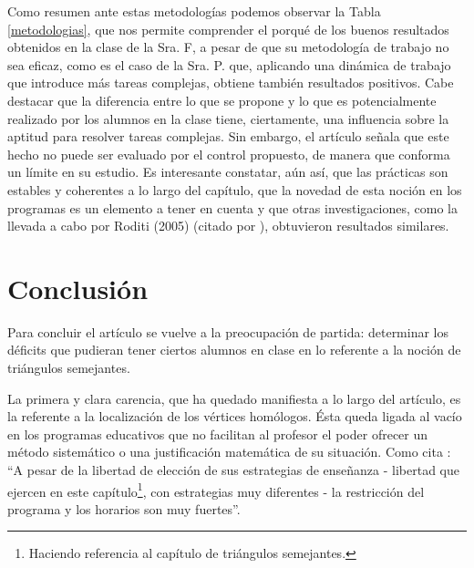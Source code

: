 	Como resumen ante estas metodologías podemos observar la Tabla \ref{metodologias}, que nos permite comprender el porqué de los buenos resultados obtenidos en la clase de la Sra. F, a pesar de que su metodología de trabajo no sea eficaz, como es el caso de la Sra. P. que, aplicando una dinámica de trabajo que introduce más tareas complejas, obtiene también resultados positivos. Cabe destacar que la diferencia entre lo que se propone y lo que es potencialmente realizado por los alumnos en la clase tiene, ciertamente, una influencia sobre la aptitud para resolver tareas complejas. Sin embargo, el artículo señala que este hecho no puede ser evaluado por el control propuesto, de manera que conforma un límite en su estudio. Es interesante constatar, aún así, que las prácticas son estables y coherentes a lo largo del capítulo, que la novedad de esta noción en los programas es un elemento a tener en cuenta y que otras investigaciones, como la llevada a cabo por Roditi (2005) (citado por \citet{Horoks}), obtuvieron resultados similares. 
	
\section*{Conclusión}
\rfoot[Conclusión]{\thepage}

	Para concluir el artículo se vuelve a la preocupación de partida: determinar los déficits que pudieran tener ciertos alumnos en clase en lo referente a la noción de triángulos semejantes.
	
	La primera y clara carencia, que ha quedado manifiesta a lo largo del artículo, es la referente a la localización de los vértices homólogos. Ésta queda ligada al vacío en los programas educativos que no facilitan al profesor el poder ofrecer un método sistemático o una justificación matemática de su situación. Como cita \citet[p. 341]{TH}: ``A pesar de la libertad de elección de sus estrategias de enseñanza - libertad que ejercen en este capítulo\footnote{Haciendo referencia al capítulo de triángulos semejantes.}, con estrategias muy diferentes - la restricción del programa y los horarios son muy fuertes''. %
	

